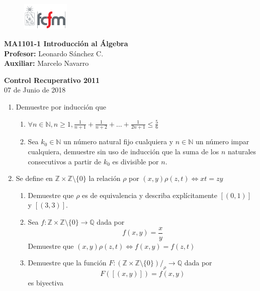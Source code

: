 \documentclass[letterpaper,11pt]{article}
\newcommand{\Q}{\mathbb Q}
\newcommand{\N}{\mathbb N}
\newcommand{\Z}{\mathbb Z}
\newcommand{\ssi}{\Longleftrightarrow} %
\theoremstyle{plain}
\begin{document}
\newpage
\pagestyle{fancy}
\fancyhf{}

\begin{figure} %
    \vspace{-5mm}
    \includegraphics[width=0.2\textwidth]{img/fcfm2.png}
\end{figure}


\noindent
\textbf{MA1101-1 Introducción al Álgebra}\\
\textbf{Profesor: }Leonardo Sánchez C.\\
\textbf{Auxiliar: }Marcelo Navarro

\begin{center}
{\bf \Large Control Recuperativo 2011} \\
{07 de Junio de 2018}
\end{center}

\begin{enumerate}[\bf P1.]

\item Demuestre por inducción que
    \begin{enumerate}
        \item $\displaystyle \forall n\in \N, n\geq 1, \frac{1}{n+1}+\frac{1}{n+2}+\dots+\frac{1}{2n+1}\leq \frac{5}{6}$
        \item Sea $k_0\in \N$ un número natural fijo cualquiera y $n\in \N$ un número impar cualquiera, demuestre sin uso de inducción que la suma de los $n$ naturales consecutivos a partir de $k_0$ es divisible por $n$.
    \end{enumerate}

\item Se define en $\Z \times \Z \setminus \{0\}$ la relación $\rho$ por $(x,y)\rho (z,t) \ssi xt=zy$
    \begin{enumerate}
        \item Demuestre que $\rho$ es de equivalencia y describa explícitamente $[(0,1)]$ y $[(3,3)]$.
        \item Sea $f: \Z \times \Z \setminus \{0\} \to \Q$ dada por
            $$f(x,y)=\frac{x}{y}$$
            Demuestre que $(x,y)\rho (z,t) \ssi f(x,y)=f(z,t)$
        \item Demuestre que la función $F: (\Z \times \Z \setminus \{0\})/_{\rho} \to \Q$ dada por
            $$F([(x,y)])=f(x,y)$$
            es biyectiva
    \end{enumerate}
\end{enumerate}
\end{document}
